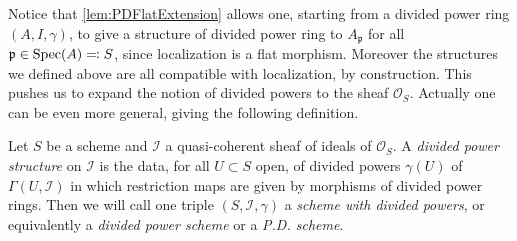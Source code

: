 \begin{rem}[]
	Notice that \cref{lem:PDFlatExtension} allows one, starting from
	a divided power ring $\left(A, I, \gamma\right)$, to give
	a structure of divided power ring to $A_{\mathfrak{p}}$ for all
	$\mathfrak{p} \in \operatorname{Spec}(A) \eqqcolon S$, since localization is a flat morphism.
	Moreover the structures we defined above are all compatible with localization, by construction.
	This pushes us to expand the notion of divided powers to the
	sheaf $\mathcal{O}_{ S }$.
	Actually one can be even more general, giving the following definition.
\end{rem}


\begin{defn}\label{defn:DividedPowersSheaf}
	Let $S$ be a scheme and $\mathcal{I}$ a quasi-coherent sheaf
	of ideals of $\mathcal{O}_{ S }$.
	A \emph{divided power structure} on $\mathcal{I}$ is the data,
	for all $U \subset S$ open, of divided powers $\gamma(U)$ 
	of $\Gamma(U,\mathcal{I})$ in which restriction maps
	are given by morphisms of divided power rings.
	Then we will call one triple $\left(S, \mathcal{I}, \gamma\right)$
	a \emph{scheme with divided powers}, or equivalently
	a \emph{divided power scheme} or a \emph{P.D. scheme}.


\end{defn}
